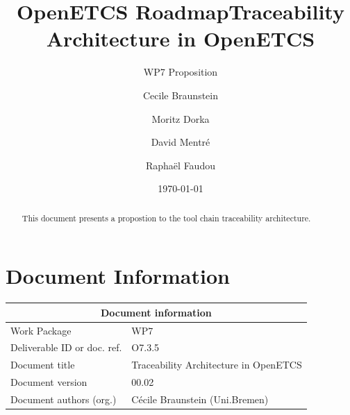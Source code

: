 \documentclass[11pt]{template/openetcs_report}
\begin{document}
\frontmatter
{}




\title{OpenETCS Roadmap}




\date{\today}
\title{Traceability Architecture in OpenETCS}
\subtitle{WP7 Proposition}

\techassessorname{}
\techassessoraffil{}

\qualityassessorname{}
\qualityassessoraffil{}

\approvalname{}
\approvalaffil{}
\author{Cecile Braunstein}

\author{Moritz Dorka}

\author{David Mentré}

\author{Raphaël Faudou}





\begin{abstract}
This document presents a propostion to the tool chain traceability
architecture.
\end{abstract}


\maketitle
\tableofcontents

\newpage

\chapter{Document Information}

\begin{tabular}{|p{4.4cm}|p{8.7cm}|}
\hline
\multicolumn{2}{|c|}{Document information} \\
\hline
Work Package &  WP7  \\
Deliverable ID or doc. ref. & O7.3.5\\
\hline
Document title &Traceability Architecture in OpenETCS \\
Document version & 00.02 \\
Document authors (org.)  & Cécile Braunstein (Uni.Bremen) \\
\hline
\end{tabular}
\end{document}
